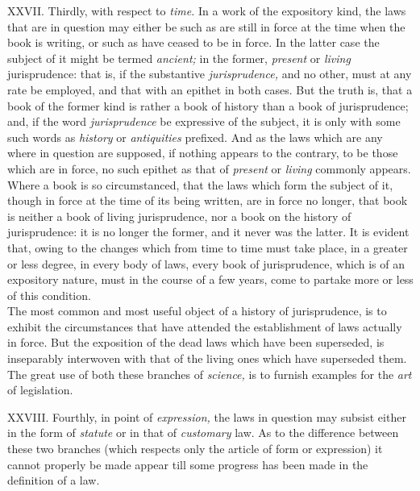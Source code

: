 \documentclass[12pt]{report}
\begin{document}
XXVII. Thirdly, with respect to \emph{time.} In a work of the expository
kind, the laws that are in question may either be such as are still in
force at the time when the book is writing, or such as have ceased to be
in force. In the latter case the subject of it might be termed
\emph{ancient;} in the former, \emph{present} or \emph{living}
jurisprudence: that is, if the substantive \emph{jurisprudence,} and no
other, must at any rate be employed, and that with an epithet in both
cases. But the truth is, that a book of the former kind is rather a book
of history than a book of jurisprudence; and, if the word
\emph{jurisprudence} be expressive of the subject, it is only with some
such words as \emph{history} or \emph{antiquities} prefixed. And as the
laws which are any where in question are supposed, if nothing appears to
the contrary, to be those which are in force, no such epithet as that of
\emph{present} or \emph{living} commonly appears.\\
Where a book is so circumstanced, that the laws which form the subject
of it, though in force at the time of its being written, are in force no
longer, that book is neither a book of living jurisprudence, nor a book
on the history of jurisprudence: it is no longer the former, and it
never was the latter. It is evident that, owing to the changes which
from time to time must take place, in a greater or less degree, in every
body of laws, every book of jurisprudence, which is of an expository
nature, must in the course of a few years, come to partake more or less
of this condition.\\
The most common and most useful object of a history of jurisprudence, is
to exhibit the circumstances that have attended the establishment of
laws actually in force. But the exposition of the dead laws which have
been superseded, is inseparably interwoven with that of the living ones
which have superseded them. The great use of both these branches of
\emph{science,} is to furnish examples for the \emph{art} of
legislation.

XXVIII. Fourthly, in point of \emph{expression,} the laws in question
may subsist either in the form of \emph{statute} or in that of
\emph{customary} law. As to the difference between these two branches
(which respects only the article of form or expression) it cannot
properly be made appear till some progress has been made in the
definition of a law.
\end{document}

